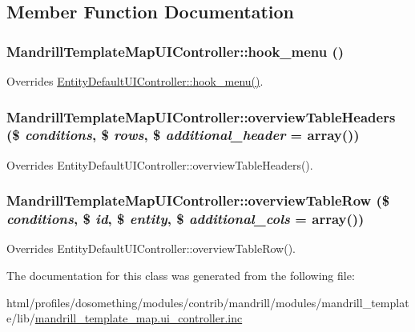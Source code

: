 \subsection{Member Function Documentation}
\hypertarget{classMandrillTemplateMapUIController_a2a8247480b6adee6a713f059dcda0f3c}{
\subsubsection[{hook\_\-menu}]{\setlength{\rightskip}{0pt plus 5cm}MandrillTemplateMapUIController::hook\_\-menu ()}}
\label{classMandrillTemplateMapUIController_a2a8247480b6adee6a713f059dcda0f3c}
Overrides \hyperlink{group__hooks_ga5c95244fea59b25666e409759e133ded}{EntityDefaultUIController::hook\_\-menu()}. \hypertarget{classMandrillTemplateMapUIController_af04e2a9195b76ab516f8087a4408052b}{
\subsubsection[{overviewTableHeaders}]{\setlength{\rightskip}{0pt plus 5cm}MandrillTemplateMapUIController::overviewTableHeaders (\$ {\em conditions}, \/  \$ {\em rows}, \/  \$ {\em additional\_\-header} = {\ttfamily array()})}}
\label{classMandrillTemplateMapUIController_af04e2a9195b76ab516f8087a4408052b}
Overrides EntityDefaultUIController::overviewTableHeaders(). \hypertarget{classMandrillTemplateMapUIController_a4f326c7f1cc320a2c4d237df4f05a326}{
\subsubsection[{overviewTableRow}]{\setlength{\rightskip}{0pt plus 5cm}MandrillTemplateMapUIController::overviewTableRow (\$ {\em conditions}, \/  \$ {\em id}, \/  \$ {\em entity}, \/  \$ {\em additional\_\-cols} = {\ttfamily array()})}}
\label{classMandrillTemplateMapUIController_a4f326c7f1cc320a2c4d237df4f05a326}
Overrides EntityDefaultUIController::overviewTableRow(). 

The documentation for this class was generated from the following file:\begin{DoxyCompactItemize}
\item 
html/profiles/dosomething/modules/contrib/mandrill/modules/mandrill\_\-template/lib/\hyperlink{mandrill__template__map_8ui__controller_8inc}{mandrill\_\-template\_\-map.ui\_\-controller.inc}\end{DoxyCompactItemize}
